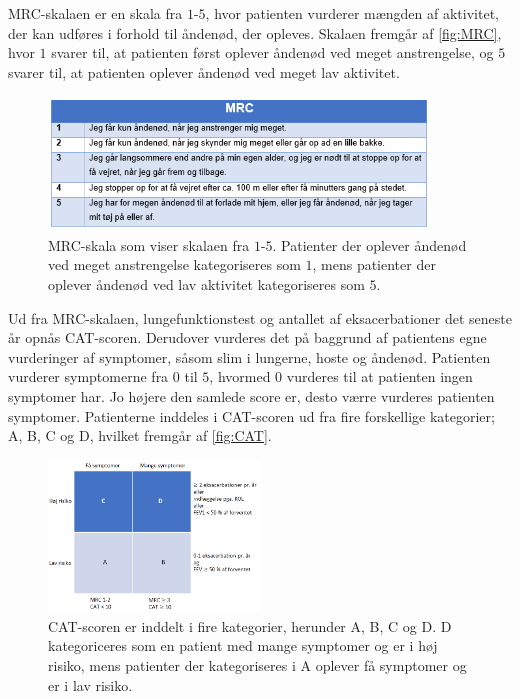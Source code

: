 MRC-skalaen er en skala fra $1$-$5$, hvor patienten vurderer mængden af aktivitet, der kan udføres i forhold til åndenød, der opleves. Skalaen fremgår af \autoref{fig:MRC}, hvor $1$ svarer til, at patienten først oplever åndenød ved meget anstrengelse, og $5$ svarer til, at patienten oplever åndenød ved meget lav aktivitet. \cite{Basisbogen2016}

\begin{figure} [H]
\centering
\includegraphics[width=0.9\textwidth]{figures/MRC}
\caption{MRC-skala som viser skalaen fra $1$-$5$. Patienter der oplever åndenød ved meget anstrengelse kategoriseres som $1$, mens patienter der oplever åndenød ved lav aktivitet kategoriseres som $5$.\cite{Basisbogen2016}}
\label{fig:MRC}
\end{figure} 

\noindent
Ud fra MRC-skalaen, lungefunktionstest og antallet af eksacerbationer det seneste år opnås CAT-scoren. Derudover vurderes det på baggrund af patientens egne vurderinger af symptomer, såsom slim i lungerne, hoste og åndenød. Patienten vurderer symptomerne fra $0$ til $5$, hvormed $0$ vurderes til at patienten ingen symptomer har. Jo højere den samlede score er, desto værre vurderes patienten symptomer. \cite{Basisbogen2016, dsam2016} Patienterne inddeles i CAT-scoren ud fra fire forskellige kategorier; A, B, C og D, hvilket fremgår af \autoref{fig:CAT}.

\begin{figure} [H]
\centering
\includegraphics[width=0.5\textwidth]{figures/CAT}
\caption{CAT-scoren er inddelt i fire kategorier, herunder A, B, C og D. D kategoriceres som en patient med mange symptomer og er i høj risiko, mens patienter der kategoriseres i A oplever få symptomer og er i lav risiko. \cite{Basisbogen2016, Sundhed2013}}
\label{fig:CAT}
\end{figure} 
 
